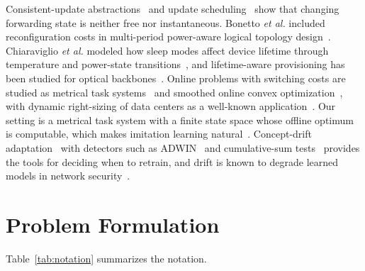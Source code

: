 \documentclass[journal]{IEEEtran}
\begin{document}
Consistent-update abstractions~\cite{reitblatt2012abstractions} and update scheduling~\cite{jin2014dionysus} show that changing forwarding state is neither free nor instantaneous. Bonetto \emph{et al.} included reconfiguration costs in multi-period power-aware logical topology design~\cite{bonetto2013multiperiod}. Chiaraviglio \emph{et al.} modeled how sleep modes affect device lifetime through temperature and power-state transitions~\cite{chiaraviglio2015lifetime,chiaraviglio2014impact}, and lifetime-aware provisioning has been studied for optical backbones~\cite{wiatr2016lifetime}. Online problems with switching costs are studied as metrical task systems~\cite{borodin1992mts} and smoothed online convex optimization~\cite{chen2018obd}, with dynamic right-sizing of data centers as a well-known application~\cite{lin2013rightsizing}. Our setting is a metrical task system with a finite state space whose offline optimum is computable, which makes imitation learning natural~\cite{ross2011dagger}. Concept-drift adaptation~\cite{gama2014drift,lu2019drift} with detectors such as ADWIN~\cite{bifet2007adwin} and cumulative-sum tests~\cite{page1954cusum} provides the tools for deciding when to retrain, and drift is known to degrade learned models in network security~\cite{andresini2021insomnia}.

\section{Problem Formulation}\label{sec:problem}

Table~\ref{tab:notation} summarizes the notation.
\end{document}
